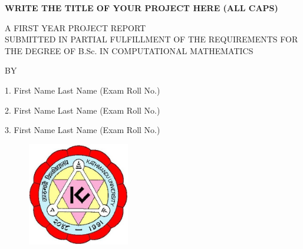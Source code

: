 \documentclass[a4paper,12pt]{report}    %
\begin{document}


{\large
\begin{center}
{{\bf{\color{red}WRITE THE TITLE OF YOUR PROJECT HERE (ALL CAPS)}}}\\
\end{center}


\vspace{0.8cm}

{\normalsize
\begin{center}
A FIRST YEAR PROJECT REPORT\\

\vspace{0.5cm}
SUBMITTED IN PARTIAL FULFILLMENT OF THE REQUIREMENTS FOR\\
THE DEGREE OF B.Sc. IN COMPUTATIONAL MATHEMATICS\\

\vspace{1.0cm}

BY
\end{center}
\begin{center}
\begin{itemize}
\begin{center}
\item[1.] First Name Last Name (Exam Roll No.)
\item[2.] First Name Last Name (Exam Roll No.)
\item[3.] First Name Last Name (Exam Roll No.)
\end{center}
\end{itemize}

\end{center}


\vspace{1.0cm}

\begin{figure}[htpb]
\centering
\includegraphics[height=4.5cm,width=4.5cm]{photos/kulogo.jpg}
\end{figure}


}}
\end{document}
